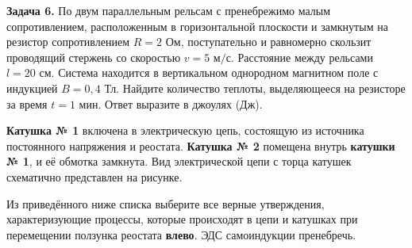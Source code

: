 \begin{taskbasic}[code={\label{task:elem_ind_v30_n23}}]
\textbf{Задача 6.} По двум параллельным рельсам с пренебрежимо малым сопротивлением, расположенным в горизонтальной плоскости и замкнутым на резистор сопротивлением $R = 2\text{ Ом}$, поступательно и равномерно скользит проводящий стержень со скоростью $v = 5\text{ м/с}$. Расстояние между рельсами $l = 20\text{ см}$. Система находится в вертикальном однородном магнитном поле с индукцией $B = 0{,}4\text{ Тл}$. Найдите количество теплоты, выделяющееся на резисторе за время $t = 1\text{ мин}$. Ответ выразите в джоулях (Дж).

\end{taskbasic}

\textbf{Катушка № 1} включена в электрическую цепь, состоящую из источника постоянного напряжения и реостата. \textbf{Катушка № 2} помещена внутрь \textbf{катушки № 1}, и её обмотка замкнута. Вид электрической цепи с торца катушек схематично представлен на рисунке.

\begin{center}
\end{center}

\noindent Из приведённого ниже списка выберите все верные утверждения, характеризующие процессы, которые происходят в цепи и катушках при перемещении ползунка реостата \textbf{влево}. ЭДС самоиндукции пренебречь.

